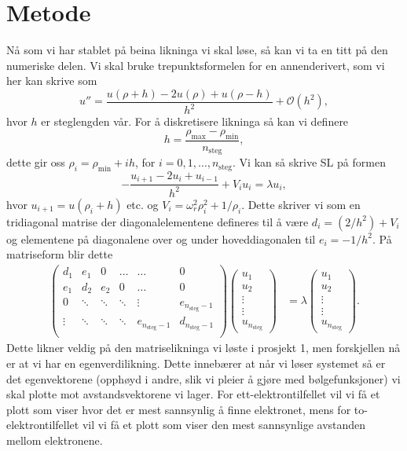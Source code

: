 \documentclass[norsk, 12pt]{article}
\theoremstyle{definition} \newtheorem{defi}{Definisjon}[subsection]
\theoremstyle{definition} \newtheorem{teo}{Teorem}[subsection]
\theoremstyle{definition} \newtheorem*{eks}{Eksempel}
\begin{document}
\section*{Metode}
Nå som vi har stablet på beina likninga vi skal løse, så kan vi ta en titt på den numeriske delen. Vi skal bruke trepunktsformelen for en annenderivert, som vi her kan skrive som
$$ u'' = \frac{u(\rho + h) - 2u(\rho) + u(\rho - h)}{h^2} + \mathcal{O}(h^2), $$
hvor $h$ er steglengden vår. For å diskretisere likninga så kan vi definere
$$ h = \frac{\rho_{\text{max}} - \rho_{\text{min}}}{n_{\text{steg}}}, $$
dette gir oss $\rho_i = \rho_{\text{min}} + ih$, for $i=0,1,\ldots,n_\text{steg}$. Vi kan så skrive SL på formen
$$ -\frac{u_{i+1} - 2u_i + u_{i-1}}{h^2} + V_i u_i = \lambda u_i, $$
hvor $u_{i+1} = u(\rho_i + h)$ etc. og $V_i = \omega_r^2\rho_i^2 + 1/\rho_i$. Dette skriver vi som en tridiagonal matrise der diagonalelementene defineres til å være $d_i = (2/h^2) + V_i$ og elementene på diagonalene over og under hoveddiagonalen til $e_i = -1/h^2$. På matriseform blir dette
\begin{align*}
	\left(\begin{matrix}
	d_1 & e_1 & 0 & \ldots & \ldots & 0 \\
	e_1 & d_2 & e_2 & 0 & \ldots & 0 \\
	0 & \ddots & \ddots & \ddots & \vdots & e_{n_{\text{steg}} - 1} \\
	\vdots & \ddots & \ddots & \ddots & e_{n_{\text{steg}} - 1} & d_{n_{\text{steg}} - 1} \\
	\end{matrix}\right)\left(
	\begin{matrix}
	u_1 \\ u_2 \\ \vdots \\ \vdots \\ u_{n_{\text{steg}}}
	\end{matrix}\right)
	&= \lambda\left(\begin{matrix}
	u_1 \\ u_2 \\ \vdots \\ \vdots \\ u_{n_{\text{steg}}}
	\end{matrix}\right).
\end{align*}
Dette likner veldig på den matriselikninga vi løste i prosjekt 1, men forskjellen nå er at vi har en egenverdilikning. Dette innebærer at når vi løser systemet så er det egenvektorene (opphøyd i andre, slik vi pleier å gjøre med bølgefunksjoner) vi skal plotte mot avstandsvektorene vi lager. For ett-elektrontilfellet vil vi få et plott som viser hvor det er mest sannsynlig å finne elektronet, mens for to-elektrontilfellet vil vi få et plott som viser den mest sannsynlige avstanden mellom elektronene.
\end{document}
